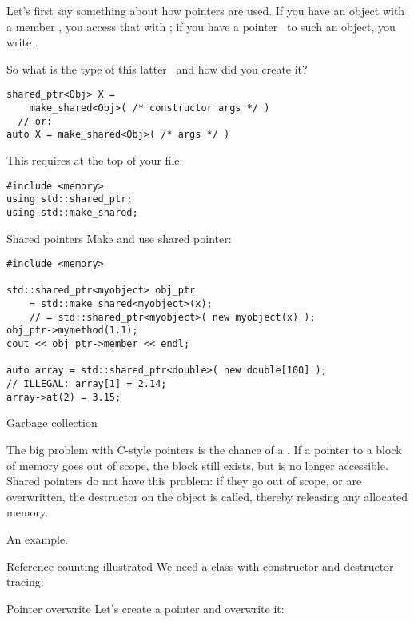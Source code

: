 Let's first say something about how pointers are used. If you have an
object  with a member , you access that with ; if you
have a pointer~ to such an object, you write .

So what is the type of this latter~ and how did you create it?
\begin{verbatim}
shared_ptr<Obj> X =
    make_shared<Obj>( /* constructor args */ )
  // or:
auto X = make_shared<Obj>( /* args */ )
\end{verbatim}

This requires at the top of your file:
\begin{verbatim}
#include <memory>
using std::shared_ptr;
using std::make_shared;
\end{verbatim}

\begin{slide}{Shared pointers}
  \label{sl:shared-ptr}
Make and use shared pointer:
\begin{verbatim}
#include <memory>

std::shared_ptr<myobject> obj_ptr
    = std::make_shared<myobject>(x);
    // = std::shared_ptr<myobject>( new myobject(x) );
obj_ptr->mymethod(1.1);
cout << obj_ptr->member << endl;

auto array = std::shared_ptr<double>( new double[100] );
// ILLEGAL: array[1] = 2.14;
array->at(2) = 3.15;
\end{verbatim}
\end{slide}

 {Garbage collection}

The big problem with C-style pointers is the chance of a
. If a pointer to a block of memory goes out of
scope, the block still exists, but is no longer accessible. Shared
pointers do not have this problem: if they go out of scope, or are
overwritten, the destructor on the object is called, thereby releasing
any allocated memory.

An example.

\begin{block}{Reference counting illustrated}
  \label{sl:construct-destruct-trace}
  We need a class with constructor and destructor tracing:
\end{block}

\begin{block}{Pointer overwrite}
  \label{sl:shared-ptr-overwrite}
  Let's create a pointer and overwrite it:
\end{block}

